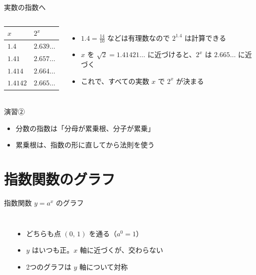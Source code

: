 \documentclass[aspectratio=169]{beamer}
\begin{document}
\begin{frame}{実数の指数へ}
  \begin{columns}[c]
      \begin{center}
        \begin{tabular}{ll}
          \toprule
          $x$ & $2^x$ \\
          \midrule
          $1.4$ & $2.639\ldots$ \\
          $1.41$ & $2.657\ldots$ \\
          $1.414$ & $2.664\ldots$ \\
          $1.4142$ & $2.665\ldots$ \\
          \bottomrule
        \end{tabular}
      \end{center}
      \begin{itemize}
        \item $1.4 = \frac{14}{10}$ などは有理数なので $2^{1.4}$ は計算できる
        \item $x$ を $\sqrt{2} = 1.41421\ldots$ に近づけると、$2^x$ は $2.665\ldots$ に近づく
        \item これで、すべての実数 $x$ で $2^x$ が決まる
      \end{itemize}
  \end{columns}
\end{frame}

\begin{frame}{演習②}
  \bigskip
  \begin{itemize}
    \item 分数の指数は「分母が累乗根、分子が累乗」
    \item 累乗根は、指数の形に直してから法則を使う
  \end{itemize}
\end{frame}

\section{指数関数のグラフ}

\begin{frame}{指数関数 $y = a^x$ のグラフ}
  \begin{columns}[c]
      \begin{center}
        
      \end{center}
      \begin{itemize}
        \item どちらも点 $(0,\,1)$ を通る（$a^0 = 1$）
        \item $y$ はいつも正。$x$ 軸に近づくが、交わらない
        \item 2つのグラフは $y$ 軸について対称
      \end{itemize}
  \end{columns}
\end{frame}
\end{document}
